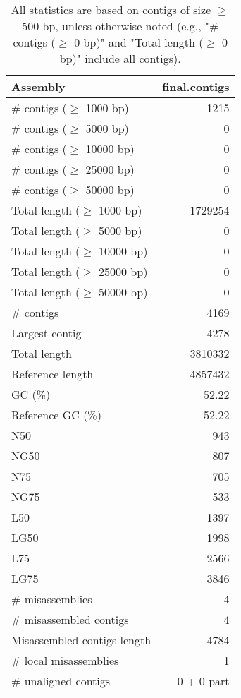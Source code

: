 \documentclass[12pt,a4paper]{article}
\begin{document}
\begin{table}[ht]
\begin{center}
\caption{All statistics are based on contigs of size $\geq$ 500 bp, unless otherwise noted (e.g., "\# contigs ($\geq$ 0 bp)" and "Total length ($\geq$ 0 bp)" include all contigs).}
\begin{tabular}{|l*{1}{|r}|}
\hline
Assembly & final.contigs \\ \hline
\# contigs ($\geq$ 1000 bp) & 1215 \\ \hline
\# contigs ($\geq$ 5000 bp) & 0 \\ \hline
\# contigs ($\geq$ 10000 bp) & 0 \\ \hline
\# contigs ($\geq$ 25000 bp) & 0 \\ \hline
\# contigs ($\geq$ 50000 bp) & 0 \\ \hline
Total length ($\geq$ 1000 bp) & 1729254 \\ \hline
Total length ($\geq$ 5000 bp) & 0 \\ \hline
Total length ($\geq$ 10000 bp) & 0 \\ \hline
Total length ($\geq$ 25000 bp) & 0 \\ \hline
Total length ($\geq$ 50000 bp) & 0 \\ \hline
\# contigs & 4169 \\ \hline
Largest contig & 4278 \\ \hline
Total length & 3810332 \\ \hline
Reference length & 4857432 \\ \hline
GC (\%) & 52.22 \\ \hline
Reference GC (\%) & 52.22 \\ \hline
N50 & 943 \\ \hline
NG50 & 807 \\ \hline
N75 & 705 \\ \hline
NG75 & 533 \\ \hline
L50 & 1397 \\ \hline
LG50 & 1998 \\ \hline
L75 & 2566 \\ \hline
LG75 & 3846 \\ \hline
\# misassemblies & 4 \\ \hline
\# misassembled contigs & 4 \\ \hline
Misassembled contigs length & 4784 \\ \hline
\# local misassemblies & 1 \\ \hline
\# unaligned contigs & 0 + 0 part \\ \hline

\end{tabular}
\end{center}
\end{table}
\end{document}
